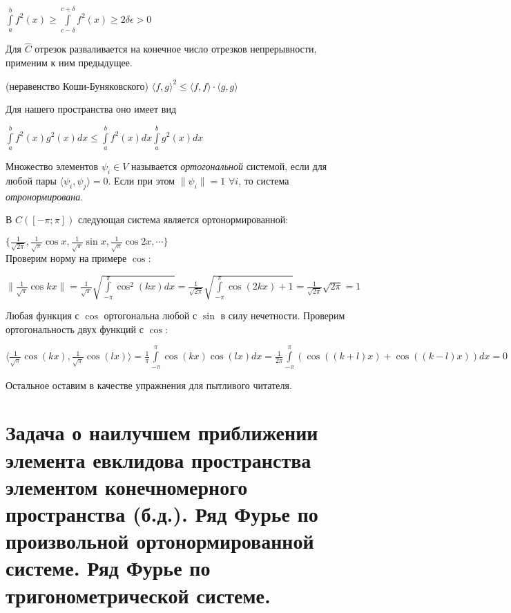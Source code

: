 \documentclass{article}
\begin{document}
	$\int\limits_a^b f^2(x) \ge \int\limits_{c-\delta}^{c+\delta} f^2(x) \ge 2\delta\epsilon > 0$
	
	Для $\hat C$ отрезок разваливается на конечное число отрезков непрерывности, применим к ним предыдущее.
	
	\begin{theorem} (неравенство Коши-Буняковского) $\langle f, g \rangle^2 \le \langle f, f \rangle \cdot \langle g, g \rangle$ \end{theorem}
	
	Для нашего пространства оно имеет вид 
	
	$\int\limits_a^b f^2(x)g^2(x)dx \le \int\limits_a^b f^2(x)dx \int\limits_a^b g^2(x)dx$
	
	\begin{definition}
		Множество элементов  ${\psi_i} \in V$ называется \textit{ортогональной} системой, если для любой пары $\langle \psi_i, \psi_j\rangle=0$. Если при этом $\| \psi_i \|=1$ $\forall i$, то система \textit{отронормирована}.
	\end{definition}

	В $C([-\pi; \pi])$ следующая система является ортонормированной:
	
	$\{{\frac{1}{\sqrt{2\pi}}, \frac{1}{\sqrt{\pi}}\cos x, \frac{1}{\sqrt{\pi}}\sin x, \frac{1}{\sqrt{\pi}}\cos {2x}, \cdots}\}$\\
	
	Проверим норму на примере $\cos$:
	
	$\| \frac{1}{\sqrt{\pi}}\cos {kx}\|= \frac{1}{\sqrt{\pi}}
	 \sqrt{\int\limits_{-\pi}^{\pi} \cos^2 (kx) dx}=
	 \frac{1}{\sqrt{2\pi}} \sqrt{\int\limits_{-\pi}^{\pi} \cos(2kx) + 1}=\frac{1}{\sqrt{2\pi}} \sqrt{2\pi}=1$
	
	Любая функция с $\cos$ ортогональна любой с $\sin$ в силу нечетности. Проверим ортогональность двух функций с $\cos$:
	
	$\langle \frac{1}{\sqrt{\pi}} \cos(kx), \frac{1}{\sqrt{\pi}}\cos(lx) \rangle=\frac{1}{\pi}\int\limits_{-\pi}^{\pi}\cos(kx) \cos(lx) dx=\frac{1}{2\pi}\int\limits_{-\pi}^{\pi}(\cos((k+l)x)+\cos((k-l)x)) dx=0$
	
	Остальное оставим в качестве упражнения для пытливого читателя.
	
	\section{Задача о наилучшем приближении элемента евклидова пространства элементом конечномерного пространства (б.д.). Ряд Фурье по произвольной ортонормированной системе. Ряд Фурье по тригонометрической системе.}
	
\end{document}
